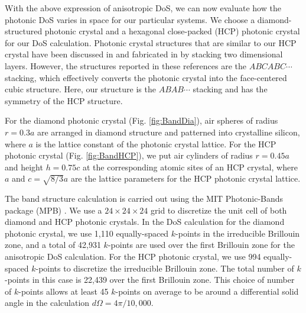 \documentclass[%
 reprint,
superscriptaddress,
 amsmath,amssymb,
 aps,
pra,
]{revtex4-1}
\begin{document}
With the above expression of anisotropic DoS, we can now evaluate how the photonic DoS varies in space for our particular systems. We choose a diamond-structured photonic crystal and a hexagonal close-packed (HCP) photonic crystal for our DoS calculation. Photonic crystal structures that are similar to our HCP crystal have been discussed in \cite{joannopoulos2011photonic6} and fabricated in \cite{qi2004three} by stacking two dimensional layers. However, the structures reported in these references are the $ABCABC\cdots$ stacking, which effectively converts the photonic crystal into the face-centered cubic structure. Here, our structure is the $ABAB\cdots$ stacking and has the symmetry of the HCP structure.

For the diamond photonic crystal (Fig. \ref{fig:BandDia}), air spheres of radius $r=0.3a$ are arranged in diamond structure and patterned into crystalline silicon, where $a$ is the lattice constant of the photonic crystal lattice. For the HCP photonic crystal (Fig. \ref{fig:BandHCP}), we put air cylinders of radius $r=0.45a$ and height $h=0.75c$ at the corresponding atomic sites of an HCP crystal, where $a$ and $c=\sqrt{8/3}a$ are the lattice parameters for the HCP photonic crystal lattice.



The band structure calculation is carried out using the MIT Photonic-Bands package (MPB) \cite{Johnson2001:mpb}. We use a $24\times 24 \times 24$ grid to discretize the unit cell of both diamond and HCP photonic crystals. In the DoS calculation for the diamond photonic crystal, we use 1,110 equally-spaced $k$-points in the irreducible Brillouin zone, and a total of 42,931 $k$-points are used over the first Brillouin zone for the anisotropic DoS calculation. For the HCP photonic crystal, we use 994 equally-spaced $k$-points to discretize the irreducible Brillouin zone. The total number of $k$-points in this case is 22,439 over the first Brillouin zone. This choice of number of $k$-points allows at least 45 $k$-points on average to be around a differential solid angle in the calculation $d\Omega=4\pi/10,000$.
\end{document}

